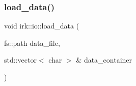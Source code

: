 \mbox{\label{namespaceirk_1_1io_aa680509002f530048131492dea584724}} 
\subsubsection{\texorpdfstring{load\+\_\+data()}{load\_data()}}
{\footnotesize\ttfamily void irk\+::io\+::load\+\_\+data (\begin{DoxyParamCaption}\item[{fs\+::path}]{data\+\_\+file,  }\item[{std\+::vector$<$ char $>$ \&}]{data\+\_\+container }\end{DoxyParamCaption})}

